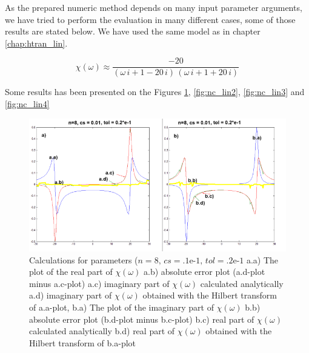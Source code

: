 \documentclass[12pt,twoside,a4paper]{article}
\numberwithin{equation}{subsection}
\numberwithin{figure}{subsection}
\begin{document}
As the prepared numeric method depends on many input parameter arguments, we have tried to perform the evaluation in many different
cases, some of those results are stated below. We have used the same model as in chapter \ref{chap:htran_lin}.

\begin{equation} \label{eq:nc_algoritm}
  \chi (\omega ) \approx \frac { - 20}{(\omega \,i + 1 - 20\,i)\,(\omega \,i + 1 + 20\,i)}
\end{equation} 

Some results has been presented on the Figures \ref{fig:nc_lin1}, \ref{fig:nc_lin2}, \ref{fig:nc_lin3} and \ref{fig:nc_lin4}

\begin{figure}
  \includegraphics[width=150mm]{img/nc_lin1.png}
  \caption{Calculations for parameters ($n=8, \,c s=\mbox{.1e-1}, \,tol=\mbox{.2e-1}$ 
     a.a) The plot of the real part of $\chi (\omega )$ 
     a.b) absolute error plot (a.d-plot minus a.c-plot) 
     a.c) imaginary part of $\chi (\omega )$ calculated analytically 
     a.d) imaginary part of $\chi (\omega )$ obtained with the Hilbert transform of a.a-plot, 
     b.a) The plot of the imaginary part of $\chi (\omega )$ 
     b.b) absolute error plot (b.d-plot minus b.c-plot) 
     b.c) real part of $\chi (\omega )$ calculated analytically 
     b.d) real part of $\chi (\omega )$ obtained with the Hilbert transform of b.a-plot 
     \label{fig:nc_lin1}
  }
\end{figure}
\end{document}

